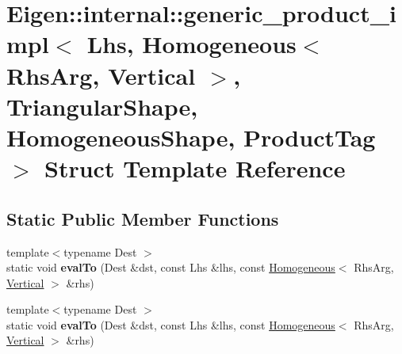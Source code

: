 \hypertarget{struct_eigen_1_1internal_1_1generic__product__impl_3_01_lhs_00_01_homogeneous_3_01_rhs_arg_00_0147df2ec49eff7619c8ef7c3518aa8800}{}\section{Eigen\+:\+:internal\+:\+:generic\+\_\+product\+\_\+impl$<$ Lhs, Homogeneous$<$ Rhs\+Arg, Vertical $>$, Triangular\+Shape, Homogeneous\+Shape, Product\+Tag $>$ Struct Template Reference}
\label{struct_eigen_1_1internal_1_1generic__product__impl_3_01_lhs_00_01_homogeneous_3_01_rhs_arg_00_0147df2ec49eff7619c8ef7c3518aa8800}
\subsection*{Static Public Member Functions}
\begin{DoxyCompactItemize}
\item 
\mbox{\label{struct_eigen_1_1internal_1_1generic__product__impl_3_01_lhs_00_01_homogeneous_3_01_rhs_arg_00_0147df2ec49eff7619c8ef7c3518aa8800_a6dd6d79a824326b33075fc72614f6332}} 
{\footnotesize template$<$typename Dest $>$ }\\static void {\bfseries eval\+To} (Dest \&dst, const Lhs \&lhs, const \hyperlink{group___geometry___module_class_eigen_1_1_homogeneous}{Homogeneous}$<$ Rhs\+Arg, \hyperlink{group__enums_ggad49a7b3738e273eb00932271b36127f7addca718e0564723df21d61b94b1198be}{Vertical} $>$ \&rhs)
\item 
\mbox{\label{struct_eigen_1_1internal_1_1generic__product__impl_3_01_lhs_00_01_homogeneous_3_01_rhs_arg_00_0147df2ec49eff7619c8ef7c3518aa8800_a6dd6d79a824326b33075fc72614f6332}} 
{\footnotesize template$<$typename Dest $>$ }\\static void {\bfseries eval\+To} (Dest \&dst, const Lhs \&lhs, const \hyperlink{group___geometry___module_class_eigen_1_1_homogeneous}{Homogeneous}$<$ Rhs\+Arg, \hyperlink{group__enums_ggad49a7b3738e273eb00932271b36127f7addca718e0564723df21d61b94b1198be}{Vertical} $>$ \&rhs)
\end{DoxyCompactItemize}


